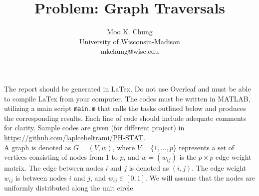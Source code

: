 \documentclass[10pt]{article} %
\begin{document}
\title{Problem: Graph Traversals}
\author{Moo K. Chung\\
University of Wisconsin-Madison\\
mkchung@wisc.edu}
\maketitle \thispagestyle{empty}
 
 The report should be generated in LaTex. Do not use Overleaf and must be able to compile LaTex from your computer. 
 The codes must be written in MATLAB, utilizing a main script \texttt{main.m} that calls the tasks outlined below and produces the corresponding results. Each line of code should include adequate comments for clarity. Sample codes are given (for different project) in \url{https://github.com/laplcebeltrami/PH-STAT}.\\




A graph is denoted as \( G = (V, w) \), where \( V = \{1, \ldots, p\} \) represents a set of vertices consisting of nodes from 1 to \( p \), and \( w = (w_{ij}) \) is the \( p \times p \) edge weight matrix. The edge between nodes $i$ and $j$ is denoted as $(i,j)$. The edge weight \( w_{ij} \) is between nodes \( i \) and \( j \), and $w_{ij} \in [0,1]$. We will assume that the nodes are uniformly distributed along the unit circle. 
\end{document}
